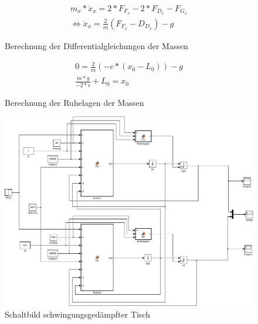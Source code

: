 \documentclass[10pt,a4paper]{article}
\begin{document}
\begin{figure}[H]
\begin{subequations}
\begin{align}
	m_x * \ddot{x}_x = 2 * F_{F_x} - 2 * F_{D_x} - F_{G_x} \\
	\iff \ddot{x}_x = \frac{2}{m} (F_{F_x} - D_{D_x}) - g
\end{align}
\end{subequations}
\caption{Berechnung der Differentialgleichungen der Massen}
\end{figure}

\begin{figure}[H]
\begin{subequations}
\begin{align}
	0 = \frac{2}{m} (-c * (x_0 - L_0)) - g \\
	\frac{m * g}{-2 * c} + L_0 = x_0
\end{align}
\end{subequations}
\caption{Berechnung der Ruhelagen der Massen}
\end{figure}

\begin{figure}[H]
	\centering
	\includegraphics[width=1\textwidth]{../aufgabe3/screens/tisch}
	\caption{Schaltbild schwingungsgedämpfter Tisch}
  \end{figure}
\end{document}
